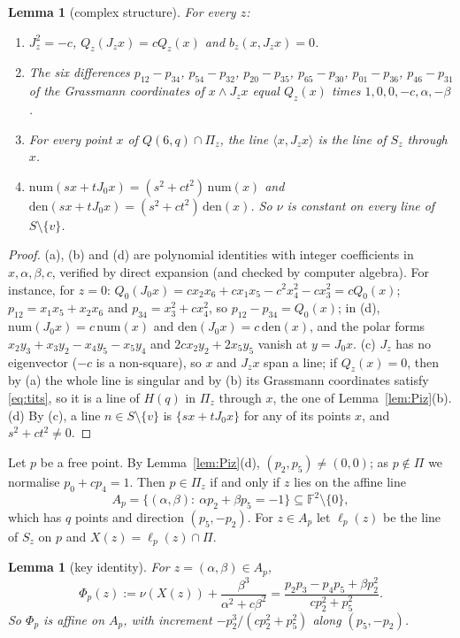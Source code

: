 \documentclass[11pt]{amsart}
\newtheorem{lemma}[theorem]{Lemma}
\theoremstyle{definition}
\theoremstyle{remark}
\numberwithin{equation}{section}
\newcommand{\F}{\mathbb F}
\begin{document}
\begin{lemma}[complex structure]\label{lem:Jz}
For every $z$:
\begin{enumerate}[label=(\alph*)]
\item $J_z^2=-c$, $Q_z(J_zx)=cQ_z(x)$ and $b_z(x,J_zx)=0$.
\item The six differences $p_{12}-p_{34}$, $p_{54}-p_{32}$, $p_{20}-p_{35}$, $p_{65}-p_{30}$, $p_{01}-p_{36}$, $p_{46}-p_{31}$ of
  the Grassmann coordinates of $x\wedge J_zx$ equal $Q_z(x)$ times $1,0,0,-c,\alpha,-\beta$.
\item For every point $x$ of $Q(6,q)\cap\Pi_z$, the line $\langle x,J_zx\rangle$ is the line of $S_z$ through $x$.
\item $\mathrm{num}(sx+tJ_0x)=(s^2+ct^2)\,\mathrm{num}(x)$ and $\mathrm{den}(sx+tJ_0x)=(s^2+ct^2)\,\mathrm{den}(x)$. So $\nu$
  is constant on every line of $S\setminus\{v\}$.
\end{enumerate}
\end{lemma}

\begin{proof}
(a), (b) and (d) are polynomial identities with integer coefficients in $x,\alpha,\beta,c$, verified by direct expansion
(and checked by computer algebra). For instance, for
$z=0$: $Q_0(J_0x)=cx_2x_6+cx_1x_5-c^2x_4^2-cx_3^2=cQ_0(x)$; $p_{12}=x_1x_5+x_2x_6$ and $p_{34}=x_3^2+cx_4^2$, so
$p_{12}-p_{34}=Q_0(x)$; in (d), $\mathrm{num}(J_0x)=c\,\mathrm{num}(x)$ and $\mathrm{den}(J_0x)=c\,\mathrm{den}(x)$, and the
polar forms $x_2y_3+x_3y_2-x_4y_5-x_5y_4$ and $2cx_2y_2+2x_5y_5$ vanish at $y=J_0x$. (c) $J_z$ has no eigenvector ($-c$ is
a non-square), so $x$ and $J_zx$ span a line; if $Q_z(x)=0$, then by (a) the whole line is singular and by (b) its
Grassmann coordinates satisfy \eqref{eq:tits}, so it is a line of $H(q)$ in $\Pi_z$ through $x$, the one of
Lemma~\ref{lem:Piz}(b). (d) By (c), a line $n\in S\setminus\{v\}$ is $\{sx+tJ_0x\}$ for any of its points $x$, and
$s^2+ct^2\ne0$.
\end{proof}

Let $p$ be a free point. By Lemma~\ref{lem:Piz}(d), $(p_2,p_5)\ne(0,0)$; as $p\notin\Pi$ we normalise $p_0+cp_4=1$. Then
$p\in\Pi_z$ if and only if $z$ lies on the affine line
\[
A_p=\{(\alpha,\beta):\ \alpha p_2+\beta p_5=-1\}\subseteq\F^2\setminus\{0\},
\]
which has $q$ points and direction $(p_5,-p_2)$. For $z\in A_p$ let $\ell_p(z)$ be the line of $S_z$ on $p$ and
$X(z)=\ell_p(z)\cap\Pi$.

\begin{lemma}[key identity]\label{lem:key}
For $z=(\alpha,\beta)\in A_p$,
\[
\Phi_p(z):=\nu(X(z))+\frac{\beta^3}{\alpha^2+c\beta^2}=\frac{p_2p_3-p_4p_5+\beta p_2^2}{cp_2^2+p_5^2}.
\]
So $\Phi_p$ is affine on $A_p$, with increment $-p_2^3/(cp_2^2+p_5^2)$ along $(p_5,-p_2)$.
\end{lemma}
\end{document}
